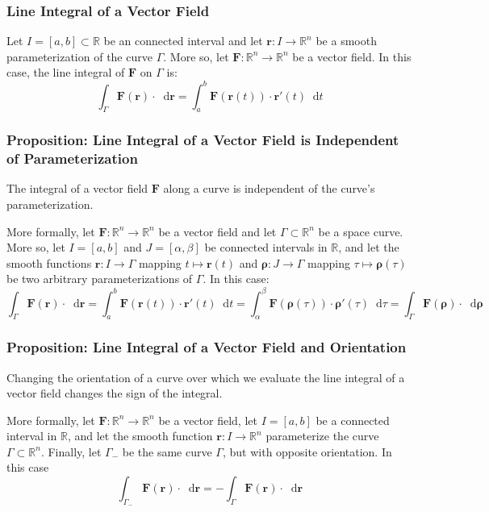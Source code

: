 \documentclass[11pt, a4paper]{article}
\newcommand{\diff}{\mathop{}\!\mathrm{d}} %
\begin{document}
\subsubsection{Line Integral of a Vector Field}
Let $ I = [a, b] \subset \mathbb{R} $ be an connected interval and let $ \bm{r} : I \rightarrow \mathbb{R}^n $ be a smooth parameterization of the curve $ \Gamma $. More so, let $ \bm{F} : \mathbb{R}^n \rightarrow \mathbb{R}^n $ be a vector field. In this case, the line integral of $ \bm{F} $ on $ \Gamma $ is:
\begin{equation*}
	\int_\Gamma \bm{F}(\bm{r}) \cdot \diff \bm{r} = \int_{a}^{b} \bm{F}(\bm{r}(t)) \cdot \bm{r}'(t) \diff t
\end{equation*}

\subsubsection{Proposition: Line Integral of a Vector Field is Independent of Parameterization}

The integral of a vector field $ \bm{F} $ along a curve is independent of the curve's parameterization. 
	
More formally, let $ \bm{F} : \mathbb{R}^n \rightarrow \mathbb{R}^n $ be a vector field and let $ \Gamma \subset \mathbb{R}^n$ be a space curve. More so, let $ I = [a, b] $ and $ J = [\alpha, \beta]$ be connected intervals in $ \mathbb{R} $, and let the smooth functions $ \bm{r} : I \rightarrow \Gamma $ mapping $ t \mapsto \bm{r}(t) $ and $ \bm{\rho} : J \rightarrow \Gamma $ mapping $ \tau \mapsto \bm{\rho}(\tau) $ be two arbitrary parameterizations of $ \Gamma $. In this case:
\begin{equation*}
	\int_\Gamma \bm{F}(\bm{r}) \cdot \diff \bm{r} = \int_{a}^{b} \bm{F}(\bm{r}(t)) \cdot \bm{r}'(t) \diff t = \int_{\alpha}^{\beta} \bm{F}(\bm{\rho}(\tau)) \cdot \bm{\rho}'(\tau) \diff \tau =\int_\Gamma \bm{F}(\bm{\rho}) \cdot \diff \bm{\rho}
\end{equation*}

\subsubsection{Proposition: Line Integral of a Vector Field and Orientation}
Changing the orientation of a curve over which we evaluate the line integral of a vector field changes the sign of the integral. 

More formally, let $ \bm{F} : \mathbb{R}^n \rightarrow \mathbb{R}^n $ be a vector field, let $ I = [a, b] $ be a connected interval in $ \mathbb{R} $, and let the smooth function $ \bm{r} : I \rightarrow \mathbb{R}^n $ parameterize the curve $ \Gamma \subset \mathbb{R}^n$. Finally, let $ \Gamma_{-} $ be the same curve $ \Gamma $, but with opposite orientation. In this case
\begin{equation*}
	\int_{\Gamma_{-}} \bm{F}(\bm{r}) \cdot \diff \bm{r} = - \int_{\Gamma} \bm{F}(\bm{r}) \cdot \diff \bm{r}
\end{equation*}
\end{document}
